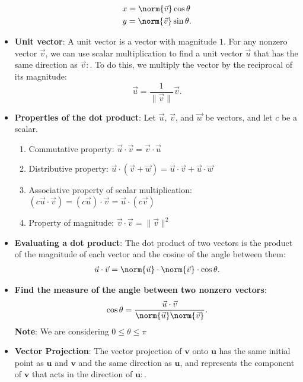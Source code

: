 \documentclass{report}
\begin{document}
\begin{itemize}
        \begin{align*}
            &x = \norm{\vec{v}}\cos{\theta } \\
            &y = \norm{\vec{v}}\sin{\theta }
        .\end{align*}
    \item \textbf{Unit vector}: A unit vector is a vector with magnitude $1$. For any nonzero vector $\vec{v}$, we can use scalar multiplication to find a unit vector $\vec{u}$ that has the same direction as $\vec{v}:$. To do this, we multiply the vector by the reciprocal of its magnitude:
        \[
            \vec{u} = \frac{1}{\lVert \vec{v} \rVert} \vec{v}.
        \]
    \item \textbf{Properties of the dot product}:
        Let $\vec{u}$, $\vec{v}$, and $\vec{w}$ be vectors, and let $c$ be a scalar.
        \begin{enumerate}
            \item Commutative property: $\vec{u} \cdot \vec{v} = \vec{v} \cdot \vec{u}$
            \item Distributive property: $\vec{u} \cdot (\vec{v} + \vec{w}) = \vec{u} \cdot \vec{v} + \vec{u} \cdot \vec{w}$
            \item Associative property of scalar multiplication: $(c\vec{u} \cdot \vec{v}) = (c\vec{u}) \cdot \vec{v} = \vec{u} \cdot (c\vec{v})$
            \item Property of magnitude: $\vec{v} \cdot \vec{v} = \|\vec{v}\|^2$
        \end{enumerate}
    \item \textbf{Evaluating a dot product}: 
        The dot product of two vectors is the product of the magnitude of each vector and the cosine of the angle between them:
        \begin{align*}
            \vec{u} \cdot \vec{v} = \norm{\vec{u}} \cdot \norm{\vec{v}} \cdot \cos{\theta }
        .\end{align*}
    \item \textbf{Find the measure of the angle between two nonzero vectors}:
        \begin{align*}
            \cos{\theta } = \frac{\vec{u} \cdot \vec{v}}{\norm{\vec{u}}\norm{\vec{v}}}
        .\end{align*}
        \bigbreak \noindent 
        \textbf{Note}: We are considering $0 \leq \theta  \leq \pi $
    \item \textbf{Vector Projection}: The vector projection of $\mathbf{v}$ onto $\mathbf{u}$ has the same initial point as $\mathbf{u}$ and $\mathbf{v}$ and the same direction as $\mathbf{u}$, and represents the component of $\mathbf{v}$ that acts in the direction of $\mathbf{u}:$.

\end{itemize}
\end{document}
